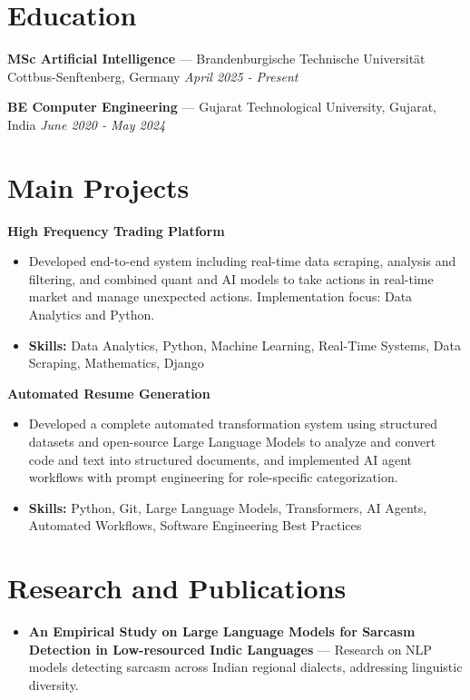 \documentclass[a4paper,10pt]{article}
\begin{document}
\section*{Education}
\textbf{MSc Artificial Intelligence} — Brandenburgische Technische Universität Cottbus-Senftenberg, Germany \hfill \textit{April 2025 - Present}\par
\vspace{1.5pt}
\textbf{BE Computer Engineering} — Gujarat Technological University, Gujarat, India \hfill \textit{June 2020 - May 2024}\par

\section*{Main Projects}
\textbf{High Frequency Trading Platform}\par
\vspace{1pt}
\begin{itemize}
  \item Developed end-to-end system including real-time data scraping, analysis and filtering, and combined quant and AI models to take actions in real-time market and manage unexpected actions. Implementation focus: Data Analytics and Python.
  \item \textbf{Skills:} Data Analytics, Python, Machine Learning, Real-Time Systems, Data Scraping, Mathematics, Django
\end{itemize}
\vspace{3pt}
\textbf{Automated Resume Generation}\par
\vspace{1pt}
\begin{itemize}
  \item Developed a complete automated transformation system using structured datasets and open-source Large Language Models to analyze and convert code and text into structured documents, and implemented AI agent workflows with prompt engineering for role-specific categorization.
  \item \textbf{Skills:} Python, Git, Large Language Models, Transformers, AI Agents, Automated Workflows, Software Engineering Best Practices
\end{itemize}

\section*{Research and Publications}
\begin{itemize}
\item \textbf{An Empirical Study on Large Language Models for Sarcasm Detection in Low-resourced Indic Languages} — Research on NLP models detecting sarcasm across Indian regional dialects, addressing linguistic diversity.
\end{itemize}
\end{document}
